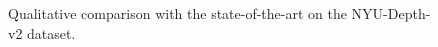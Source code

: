 \documentclass[final]{cvpr}
\begin{document}
\begin{figure}
     \hspace{0.3em}%
        \caption{Qualitative comparison with the state-of-the-art on the NYU-Depth-v2 dataset.}
        \label{fig:qualitative-comparison}
\end{figure}
\end{document}
